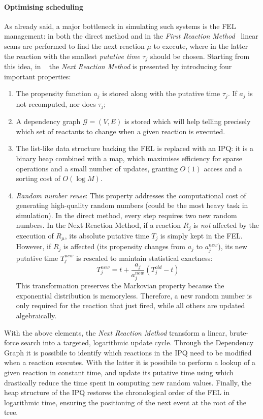 \paragraph{Optimising scheduling}
As already said, a major bottleneck in simulating such systems is the \ac{FEL}
management: in both the direct method and in the \emph{First Reaction
	Method}~\cite{GILLESPIE1976403} linear scans are performed to find the
next reaction $\mu$ to execute, where in the latter the reaction with
the smallest \emph{putative time} $\tau_j$ should be chosen.
Starting from this idea, in ~\cite{GibsonBruckEESSCSMSMC:2000} the \emph{Next Reaction
	Method} is presented by introducing four important properties:
\begin{enumerate}
	\item The propensity function $a_j$ is stored along with the putative time
	      $\tau_j$. If $a_j$ is not recomputed, nor does $\tau_j$;
	\item A dependency graph $\mathcal{G} = (V, E)$ is stored which will help
	      telling precisely which set of reactants to change when a given
	      reaction is executed.
	\item The list-like data structure backing the \ac{FEL} is replaced with an
	      \ac{IPQ}: it is a binary heap combined with a map,
	      which maximises efficiency for sparse operations and a small number of
	      updates, granting $O(1)$ access and a sorting cost of $O(\log M)$.
	\item \emph{Random number reuse}: This property addresses the computational
	      cost of generating high-quality random numbers (could be the most heavy
	      task in simulation). In the direct method, every step requires two new
	      random numbers. In the Next Reaction Method, if a reaction $R_j$ is
	      \emph{not} affected by the execution of $R_\mu$, its absolute putative
	      time $T_j$ is simply kept in the \ac{FEL}. However, if $R_j$ is
	      affected (its propensity changes from $a_j$ to $a_j^{new}$), its new
	      putative time $T_j^{new}$ is rescaled to maintain statistical
	      exactness:
	      \begin{equation}\label{eq:rand_reuse}
		      T_j^{new} = t + \frac{a_j}{a_j^{new}} (T_j^{old} - t)
	      \end{equation}
	      This transformation preserves the Markovian property because the
	      exponential distribution is memoryless. Therefore, a new random number
	      is only required for the reaction that just fired, while all others are
	      updated algebraically.
\end{enumerate}
With the above elements, the \emph{Next Reaction Method} transform a linear,
brute-force search into a targeted, logarithmic update cycle. Through the
Dependency Graph it is possibile to identify which reactions in the \ac{IPQ}
need to be modified when a reaction executes. With the latter it is possibile
to perform a lookup of a given reaction in constant time, and update its
putative time using  which drastically reduce the time
spent in computing new random values. Finally, the heap structure of the
\ac{IPQ} restores the chronological order of the \ac{FEL} in logarithmic time,
ensuring the positioning of the next event at the root of the tree.

